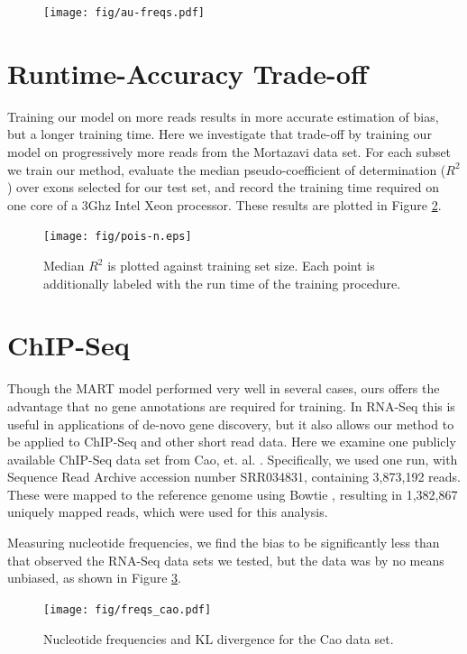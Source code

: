\documentclass[letterpaper]{article}
\begin{document}
\begin{figure}[H]
\centerline{\texttt{[image: fig/au-freqs.pdf]}}
\caption{}
\label{fig:aufreqs}
\end{figure}


\section{Runtime-Accuracy Trade-off}

Training our model on more reads results in more accurate estimation of bias,
but a longer training time. Here we investigate that trade-off by training our
model on progressively more reads from the Mortazavi data set. For each subset
we train our method, evaluate the median pseudo-coefficient of determination
($R^2$) over exons selected for our test set, and record the training time
required on one core of a 3Ghz Intel Xeon processor. These results are plotted
in Figure \ref{fig:poisn}.

\begin{figure}[H]
\texttt{[image: fig/pois-n.eps]}
\caption{Median $R^2$ is plotted against training set size. Each point is
additionally labeled with the run time of the training procedure.}
\label{fig:poisn}
\end{figure}


\section{ChIP-Seq}

Though the MART model \cite{Li2010} performed very well in several cases, ours
offers the advantage that no gene annotations are required for training.  In
RNA-Seq this is useful in applications of de-novo gene discovery, but it also
allows our method to be applied to ChIP-Seq and other short read data. Here we
examine one publicly available ChIP-Seq data set from Cao, et. al.
\cite{Cao2010}. Specifically, we used one run, with Sequence Read Archive
accession number SRR034831, containing 3,873,192 reads. These were mapped to the
reference genome using Bowtie \cite{Langmead2009}, resulting in 1,382,867
uniquely mapped reads, which were used for this analysis.

Measuring nucleotide frequencies, we find the bias to be significantly less
than that observed the RNA-Seq data sets we tested, but the data was by no means
unbiased, as shown in Figure \ref{fig:freqscao}.

\begin{figure}[H]
\begin{center}
\texttt{[image: fig/freqs\_cao.pdf]}
\end{center}
\caption{Nucleotide frequencies and KL divergence for the Cao data set.}
\label{fig:freqscao}
\end{figure}
\end{document}
